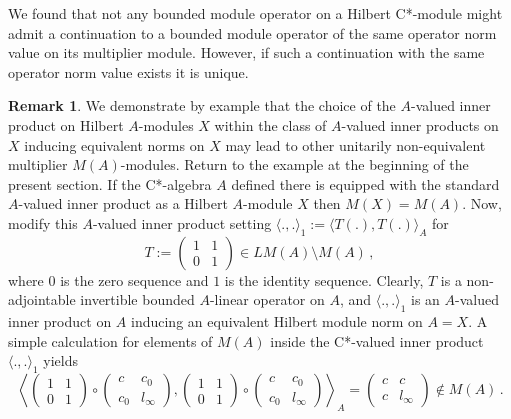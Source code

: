 \documentclass{amsart}
\theoremstyle{definition}
\newtheorem{rmk}[thm]{Remark}
\begin{document}
We found that not any bounded module operator on a Hilbert C*-module might admit a continuation to a bounded module operator of the same operator norm value on its multiplier module. However, if such a continuation with the same operator norm value exists it is unique.

\begin{rmk} \label{non-extend}
We demonstrate by example that the choice of the $A$-valued inner product on Hilbert $A$-modules $X$ within the class of $A$-valued inner products on $X$ inducing equivalent norms on $X$ may lead to other unitarily non-equivalent multiplier $M(A)$-modules. Return to the example at the beginning of the present section. If the C*-algebra $A$ defined there is equipped with the standard $A$-valued inner product as a Hilbert $A$-module $X$ then $M(X)=M(A)$. Now, modify this $A$-valued  inner product setting $\langle .,. \rangle_1 := \langle T(.),T(.) \rangle_A$ for 
\[
    T :=  \left( \begin{array}{cc} {1} & {1}\\ {0} & {1} \end{array} \right) \in LM(A) \setminus M(A) \, ,
\]
where $0$ is the zero sequence and $1$ is the identity sequence.
Clearly, $T$ is a non-adjointable invertible bounded $A$-linear operator on $A$, and $\langle .,. \rangle_1$ is an $A$-valued inner product on $A$ inducing an equivalent Hilbert module norm on $A = X$. A simple calculation for elements of $M(A)$ inside the C*-valued inner product $\langle .,. \rangle_1$ yields
\[
   \left\langle \left( \begin{array}{cc} {1} & {1}\\ {0} & {1} \end{array} \right) \circ
                   \left( \begin{array}{cc} c & c_0 \\ c_0 & l_\infty \end{array} \right) , 
                   \left( \begin{array}{cc} {1} & {1} \\ {0} & {1} \end{array} \right) \circ
                   \left( \begin{array}{cc} c & c_0 \\ c_0 & l_\infty \end{array} \right) 
   \right\rangle_A
   =
   \left( \begin{array}{cc} c & c \\ c & l_\infty \end{array} \right)  \not\in M(A) \, .
\]
\end{rmk}
\end{document}
